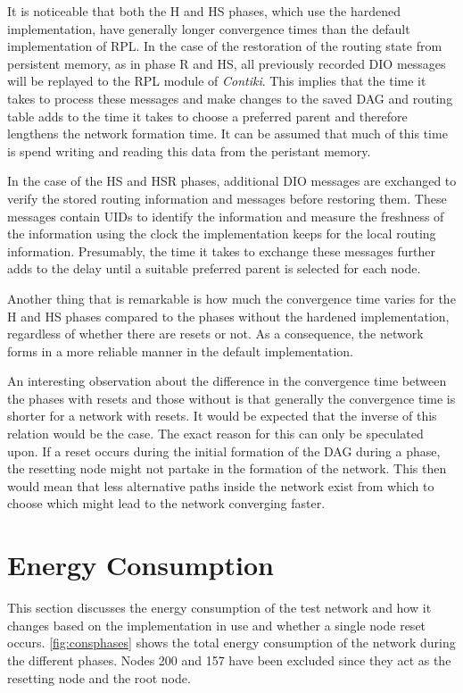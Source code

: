 It is noticeable that both the H and HS phases, which use the hardened
implementation, have generally longer convergence times than the default
implementation of \ac{RPL}. In the case of the restoration of the routing state
from persistent memory, as in phase R and HS, all previously recorded \ac{DIO}
messages will be replayed to the \ac{RPL} module of \emph{Contiki}. This implies
that the time it takes to process these messages and make changes to the saved
\ac{DAG} and routing table adds to the time it takes to choose a preferred
parent and therefore lengthens the network formation time. It can be assumed
that much of this time is spend writing and reading this data from the peristant
memory.

In the case of the HS and HSR phases, additional \ac{DIO} messages are
exchanged to verify the stored routing information and messages before restoring
them. These messages contain \acp{UID} to identify the information and measure
the freshness of the information using the clock the implementation keeps for
the local routing information. Presumably, the time it takes to exchange these
messages further adds to the delay until a suitable preferred parent is selected
for each node.

Another thing that is remarkable is how much the convergence time varies for the
H and HS phases compared to the phases without the hardened implementation,
regardless of whether there are resets or not. As a consequence, the network
forms in a more reliable manner in the default implementation.

An interesting observation about the difference in the convergence time between the
phases with resets and those without is that generally the convergence time is
shorter for a network with resets. It would be expected that the inverse of this relation would
be the case. The exact reason for this can only be speculated upon. If a reset
occurs during the initial formation of the \ac{DAG} during a phase, the
resetting node might not partake in the formation of the network. This then
would mean that less alternative paths inside the network exist from which to
choose which might lead to the network converging faster.



\section{Energy Consumption}

This section discusses the energy consumption of the test
network and how it changes based on the implementation in use and whether a single
node reset occurs. \autoref{fig:consphases} shows the total energy consumption
of the network during the different phases. Nodes 200 and 157 have been excluded
since they act as the resetting node and the root node.


